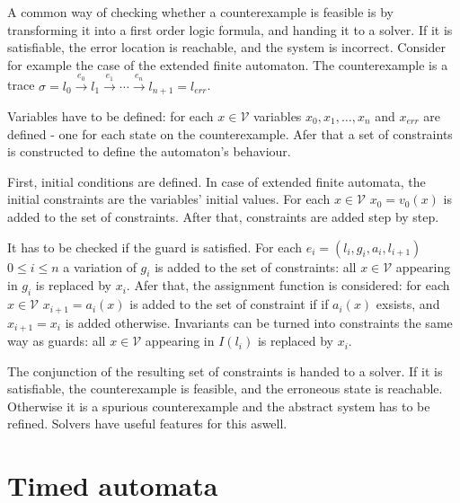  \begin{example}
 \end{example}
 
 A common way of checking whether a counterexample  is feasible is by transforming it into a first order logic formula, and handing it to a solver. If it is satisfiable, the error location is reachable, and the system is incorrect. Consider for example the case of the extended finite automaton. The counterexample is a trace $\sigma = l_0 \xrightarrow{e_0} l_1 \xrightarrow{e_1} \cdots \xrightarrow{e_n} l_{n+1}=l_{err}$.

Variables have to be defined: for each $x \in \mathcal{V}$ variables $x_0,x_1, \dots, x_n$ and $x_{err}$ are defined - one for each state on the counterexample. Afer that a set of constraints is constructed to define the automaton's behaviour. 

First, initial conditions are defined. In case of extended finite automata, the initial constraints are the variables' initial values. For each $x \in \mathcal{V}$ $x_0=v_0(x)$ is added to the set of constraints. After that, constraints are added step by step. 

It has to be checked if the guard is satisfied. For each $e_i=(l_i,g_i,a_i,l_{i+1})$ $0 \leq i \leq n$ a variation of $g_i$ is added to the set of constraints: all $x \in \mathcal{V}$ appearing in $g_i$ is replaced by $x_i$. Afer that, the assignment function is considered: for each $x \in \mathcal{V}$ $x_{i+1}=a_i(x)$ is added to the set of constraint if if $a_i(x)$ exsists, and $x_{i+1}=x_i$ is added otherwise. Invariants can be turned into constraints the same way as guards: all $x \in \mathcal{V}$ appearing in $I(l_i)$ is replaced by $x_i$. 

\begin{example}
\end{example}

The conjunction of the resulting set of constraints is handed to a solver. If it is satisfiable, the counterexample is feasible, and the erroneous state is reachable. Otherwise it is a spurious counterexample and the abstract system has to be refined. Solvers have useful features for this aswell.
 


\section{Timed automata}

